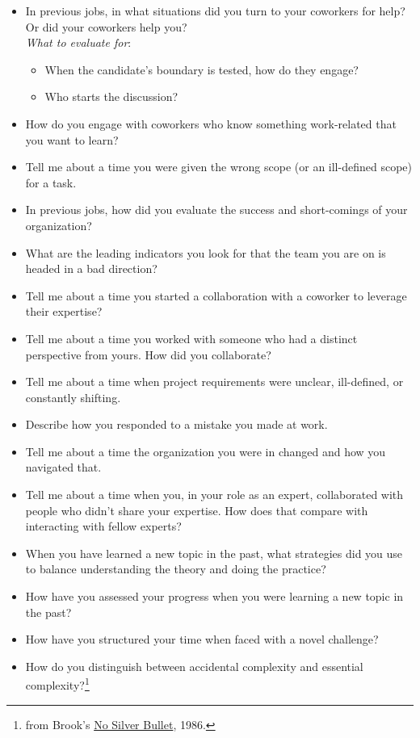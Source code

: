 \begin{itemize}
    \item In previous jobs, in what situations did you turn to your coworkers for help? Or did your coworkers help you?\\
    \textit{What to evaluate for}:
    \begin{itemize}
        \item When the candidate's boundary is tested, how do they engage?
        \item Who starts the discussion?
    \end{itemize}
    \item How do you engage with coworkers who know something work-related that you want to learn?
    \item Tell me about a time you were given the wrong scope (or an ill-defined scope) for a task. 
    \item In previous jobs, how did you evaluate the success and short-comings of your organization?
    \item What are the leading indicators you look for that the team you are on is headed in a bad direction?
    \item Tell me about a time you started a collaboration with a coworker to leverage their expertise?
    \item Tell me about a time you worked with someone who had a distinct perspective from yours. How did you collaborate?
    \item Tell me about a time when project requirements were unclear, ill-defined, or constantly shifting.
    \item Describe how you responded to a mistake you made at work.
    \item Tell me about a time the organization you were in changed and how you navigated that. 
    \item Tell me about a time when you, in your role as an expert, collaborated with people who didn't share your expertise. How does that compare with interacting with fellow experts?
    \item When you have learned a new topic in the past, what strategies did you use to balance understanding the theory and doing the practice?
    \item How have you assessed your progress when you were learning a new topic in the past?
    \item How have you structured your time when faced with a novel challenge?
    \item How do you distinguish between accidental complexity and essential complexity?\footnote{from Brook's \href{https://en.wikipedia.org/wiki/No_Silver_Bullet}{No Silver Bullet}, 1986.}
\end{itemize}

